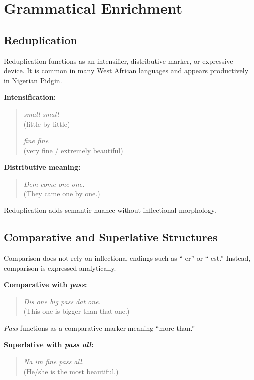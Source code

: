 \documentclass[12pt]{article}
\begin{document}
\section{Grammatical Enrichment}

\subsection{Reduplication}

Reduplication functions as an intensifier, distributive marker, or expressive device. It is common in many West African languages and appears productively in Nigerian Pidgin.

\textbf{Intensification:}

\begin{quote}
\textit{small small} \\
(little by little)

\textit{fine fine} \\
(very fine / extremely beautiful)
\end{quote}

\textbf{Distributive meaning:}

\begin{quote}
\textit{Dem come one one.} \\
(They came one by one.)
\end{quote}

Reduplication adds semantic nuance without inflectional morphology.

\subsection{Comparative and Superlative Structures}

Comparison does not rely on inflectional endings such as “-er” or “-est.” Instead, comparison is expressed analytically.

\textbf{Comparative with \textit{pass}:}

\begin{quote}
\textit{Dis one big pass dat one.} \\
(This one is bigger than that one.)
\end{quote}

\textit{Pass} functions as a comparative marker meaning “more than.”

\textbf{Superlative with \textit{pass all}:}

\begin{quote}
\textit{Na im fine pass all.} \\
(He/she is the most beautiful.)
\end{quote}
\end{document}
